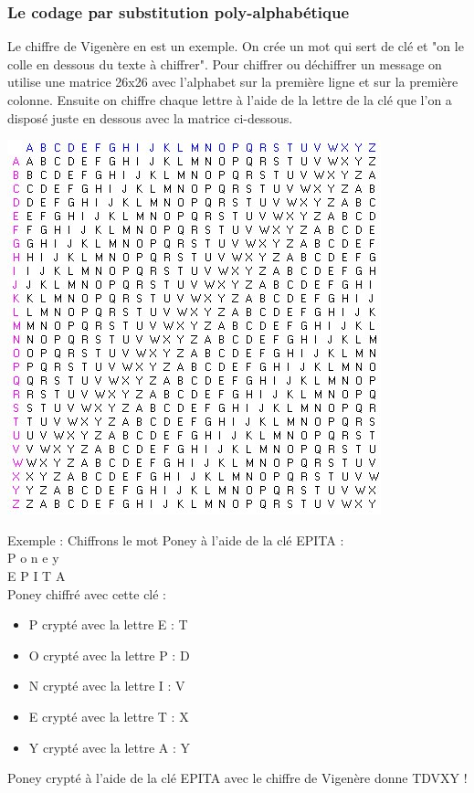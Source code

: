 \documentclass[a4paper,12pt]{article}
\begin{document}
	\subsubsection{Le codage par substitution poly-alphabétique}
	Le chiffre de Vigenère en est un exemple. On crée un mot qui sert de clé et "on le colle en dessous du texte à chiffrer". Pour chiffrer ou déchiffrer un message on utilise une matrice 26x26 avec l'alphabet sur la première ligne et sur la première colonne. Ensuite on chiffre chaque lettre à l'aide de la lettre de la clé que l'on a disposé juste en dessous avec la matrice ci-dessous.
\begin{center}
	\includegraphics[scale=0.75]{../Image/matrice.jpg}
\end{center}
	Exemple : Chiffrons le mot Poney à l'aide de la clé EPITA : \\ P o n e y \\E P I T A \\
	Poney chiffré avec cette clé :
\begin{itemize}
\item P crypté avec la lettre E : T
\item O crypté avec la lettre P : D
\item N crypté avec la lettre I : V
\item E crypté avec la lettre T : X
\item Y crypté avec la lettre A : Y
\end{itemize}
	Poney crypté à l'aide de la clé EPITA avec le chiffre de Vigenère donne TDVXY !
\end{document}
